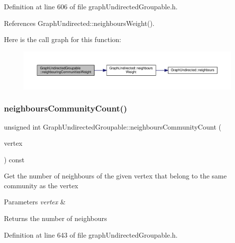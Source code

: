 Definition at line 606 of file graph\+Undirected\+Groupable.\+h.



References Graph\+Undirected\+::neighbours\+Weight().

Here is the call graph for this function\+:
\nopagebreak
\begin{figure}[H]
\begin{center}
\leavevmode
\includegraphics[width=350pt]{classGraphUndirectedGroupable_ae8d5d8cea2c1dfba0b4e7110100f2973_cgraph}
\end{center}
\end{figure}
\mbox{\label{classGraphUndirectedGroupable_ae70ef901c94e0d117abbaa5cd64a63e6}} 
\subsubsection{\texorpdfstring{neighbours\+Community\+Count()}{neighboursCommunityCount()}}
{\footnotesize\ttfamily unsigned int Graph\+Undirected\+Groupable\+::neighbours\+Community\+Count (\begin{DoxyParamCaption}\item[{const \hyperlink{edge_8h_a5fbd20c46956d479cb10afc9855223f6}{type\+Vertex} \&}]{vertex }\end{DoxyParamCaption}) const\hspace{0.3cm}{\ttfamily [inline]}}

Get the number of neighbours of the given vertex that belong to the same community as the vertex


\begin{DoxyParams}{Parameters}
{\em vertex} & \\
\hline
\end{DoxyParams}
\begin{DoxyReturn}{Returns}
the number of neighbours 
\end{DoxyReturn}


Definition at line 643 of file graph\+Undirected\+Groupable.\+h.



